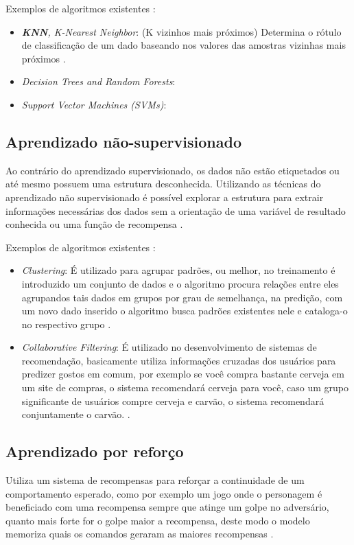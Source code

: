 Exemplos de algoritmos existentes \cite{kirk2014thoughtful}:
\begin{itemize}
    \item \textit{\textbf{KNN}, K-Nearest Neighbor}: (K vizinhos mais próximos) Determina o rótulo de classificação de um dado baseando nos valores das amostras vizinhas mais próximos \cite{kirk2014thoughtful}.
    \item \textit{Decision Trees and Random Forests}: 
    \item \textit{Support Vector Machines (SVMs)}: 
\end{itemize}

\subsection{Aprendizado não-supervisionado}
Ao contrário do aprendizado supervisionado, os dados não estão etiquetados ou até mesmo possuem uma estrutura desconhecida. Utilizando as técnicas do aprendizado não supervisionado é possível explorar a estrutura para extrair informações necessárias dos dados sem a orientação de uma variável de resultado conhecida ou uma função de recompensa \cite{geron2017hands} .

Exemplos de algoritmos existentes \cite{kirk2014thoughtful}:
\begin{itemize}
    \item \textit{Clustering}: É utilizado para agrupar padrões, ou melhor, no treinamento é introduzido um conjunto de dados e o algoritmo procura relações entre eles agrupandos tais dados em grupos por grau de semelhança, na predição, com um novo dado inserido o algoritmo busca padrões existentes nele e cataloga-o no respectivo grupo \cite{kirk2014thoughtful}.   
    \item \textit{Collaborative Filtering}: É utilizado no desenvolvimento de sistemas de recomendação, basicamente utiliza informações cruzadas dos usuários para predizer gostos em comum, por exemplo se você compra bastante cerveja em um site de compras, o sistema recomendará cerveja para você, caso um grupo significante de usuários compre cerveja e carvão, o sistema recomendará conjuntamente o carvão. \cite{kirk2014thoughtful}.  
\end{itemize}

\subsection{Aprendizado por reforço} 
Utiliza um sistema de recompensas para reforçar a continuidade de um comportamento esperado, como por exemplo um jogo onde o personagem é beneficiado com uma recompensa sempre que atinge um golpe no adversário, quanto mais forte for o golpe maior a recompensa, deste modo o modelo memoriza quais os comandos geraram as maiores recompensas \cite{kirk2014thoughtful}.


